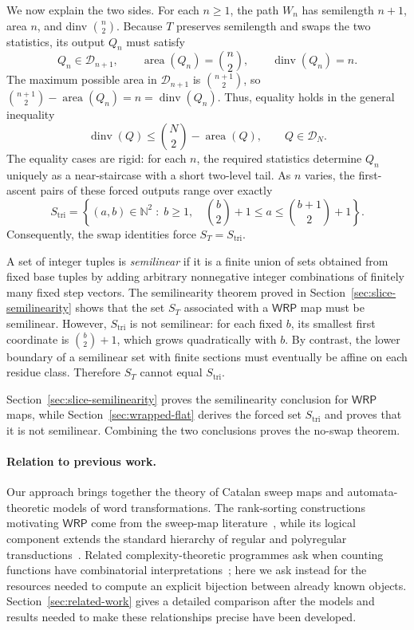 \documentclass[11pt]{article}
\theoremstyle{definition}
\newcommand{\D}{\mathcal D}
\newcommand{\N}{\mathbb N}
\newcommand{\WRP}{\mathsf{WRP}}
\newcommand{\area}{\operatorname{area}}
\newcommand{\dinv}{\operatorname{dinv}}
\begin{document}
We now explain the two sides.  For each $n\ge1$, the path $W_n$ has semilength
$n+1$, area $n$, and dinv $\binom n2$.
Because $T$ preserves semilength and swaps the two statistics, its output
$Q_n$ must satisfy
\[
   Q_n\in\D_{n+1},\qquad
   \area(Q_n)=\binom n2,\qquad
   \dinv(Q_n)=n.
\]
The maximum possible area in $\D_{n+1}$ is $\binom{n+1}{2}$, so
$\binom{n+1}{2}-\area(Q_n)=n=\dinv(Q_n)$.
Thus, equality holds in the general inequality
\[
   \dinv(Q)\le \binom N2-\area(Q),
   \qquad Q\in\D_N.
\]
The equality cases are rigid: for each $n$, the required statistics determine
$Q_n$ uniquely as a near-staircase with a short two-level tail.  As $n$
varies, the first-ascent pairs of these forced outputs range over exactly
\[
   S_{\mathrm{tri}}
   =
   \left\{(a,b)\in\N^2
      \;:\;
      b\ge 1,\quad
      \binom b2+1\le a\le\binom{b+1}{2}+1
   \right\}.
\]
Consequently, the swap identities force $S_T=S_{\mathrm{tri}}$.

A set of integer tuples is \emph{semilinear} if it is a finite union of
sets obtained from fixed base tuples by adding arbitrary nonnegative integer
combinations of finitely many fixed step vectors.  The semilinearity theorem proved in
Section~\ref{sec:slice-semilinearity} shows that the set $S_T$ associated with
a $\WRP$ map must be semilinear.
However, $S_{\mathrm{tri}}$ is not semilinear: for each fixed $b$, its smallest
first coordinate is $\binom b2+1$, which grows quadratically with $b$.  By
contrast, the lower boundary of a
semilinear set with finite sections must eventually be affine on each residue
class.  Therefore $S_T$ cannot equal $S_{\mathrm{tri}}$.

Section~\ref{sec:slice-semilinearity} proves the semilinearity conclusion for
$\WRP$ maps, while Section~\ref{sec:wrapped-flat} derives the forced set
$S_{\mathrm{tri}}$ and proves that it is not semilinear.  Combining the two
conclusions proves the no-swap theorem.

\paragraph{Relation to previous work.}

Our approach brings together the theory of Catalan sweep maps and
automata-theoretic models of word transformations.  The rank-sorting
constructions motivating $\WRP$ come from the sweep-map
literature~\cite{ArmstrongLoehrWarrington2015,
ArmstrongLoehrWarrington2016,ThomasWilliams2018}, while its logical component
extends the standard hierarchy of regular and polyregular
transductions~\cite{EngelfrietHoogeboom2001,Bojanczyk2018}.  Related
complexity-theoretic programmes ask when counting functions have combinatorial
interpretations~\cite{Pak2024WhatIs,IkenmeyerPak2022}; here we ask instead for
the resources needed to compute an explicit bijection between already known
objects.  Section~\ref{sec:related-work} gives a detailed comparison after the
models and results needed to make these relationships precise have been
developed.
\end{document}
